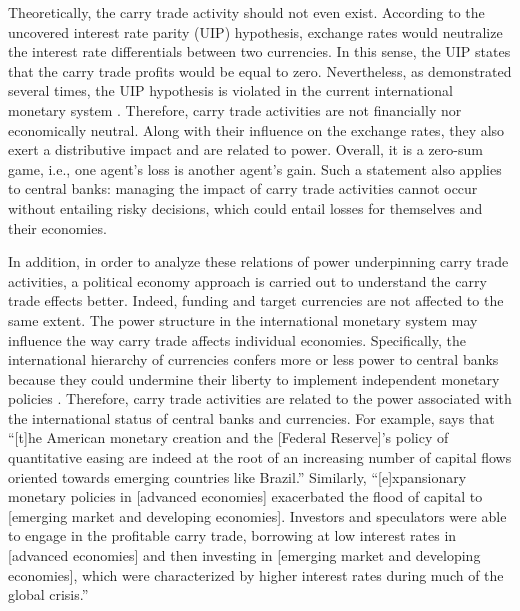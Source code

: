 \documentclass[a4paper, twoside]{templates/ociamthesis}
\begin{document}
Theoretically, the carry trade activity should not even exist. According to the uncovered interest rate parity (UIP) hypothesis, exchange rates would neutralize the interest rate differentials between two currencies. In this sense, the UIP states that the carry trade profits would be equal to zero. Nevertheless, as demonstrated several times, the UIP hypothesis is violated in the current international monetary system \autocite[e.g., see the seminal paper by][]{fama1984}. Therefore, carry trade activities are not financially nor economically neutral. Along with their influence on the exchange rates, they also exert a distributive impact and are related to power. Overall, it is a zero-sum game, i.e., one agent's loss is another agent's gain. Such a statement also applies to central banks: managing the impact of carry trade activities cannot occur without entailing risky decisions, which could entail losses for themselves and their economies.

In addition, in order to analyze these relations of power underpinning carry trade activities, a political economy approach is carried out to understand the carry trade effects better. Indeed, funding and target currencies are not affected to the same extent. The power structure in the international monetary system may influence the way carry trade affects individual economies. Specifically, the international hierarchy of currencies confers more or less power to central banks because they could undermine their liberty to implement independent monetary policies \autocite{cohen1998,deconti2013,depaula2017,fritz2018}. Therefore, carry trade activities are related to the power associated with the international status of central banks and currencies. For example, \textcite[ 386]{gaulard2012} says that ``{[}t{]}he American monetary creation and the {[}Federal Reserve{]}'s policy of quantitative easing are indeed at the root of an increasing number of capital flows oriented towards emerging countries like Brazil.'' Similarly, ``{[}e{]}xpansionary monetary policies in {[}advanced economies{]} exacerbated the flood of capital to {[}emerging market and developing economies{]}. Investors and speculators were able to engage in the profitable carry trade, borrowing at low interest rates in {[}advanced economies{]} and then investing in {[}emerging market and developing economies{]}, which were characterized by higher interest rates during much of the global crisis.'' \autocite[ 199]{grabel2018}
\end{document}
